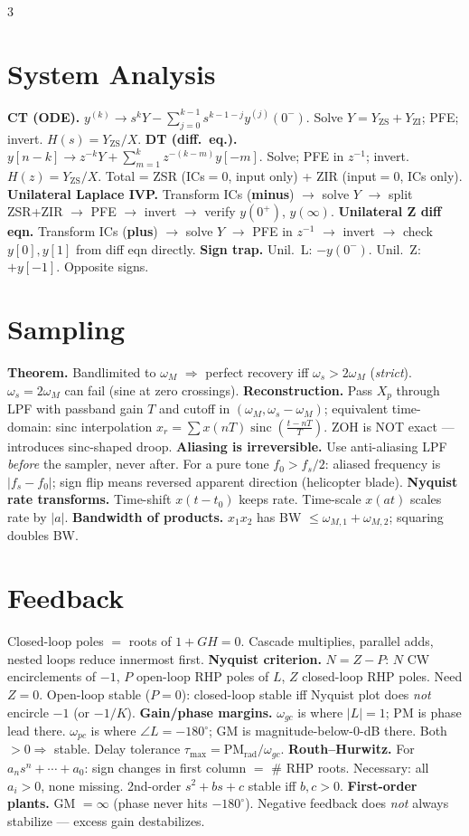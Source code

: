 \documentclass[11pt]{extarticle}
\DeclareMathOperator{\sinc}{sinc}
\begin{document}
\begin{paracol}{3}
\section*{System Analysis}
\textbf{CT (ODE).} $y^{(k)}\!\to\! s^k Y - \sum_{j=0}^{k-1}\! s^{k-1-j} y^{(j)}(0^-)$. Solve $Y=Y_{\text{ZS}}+Y_{\text{ZI}}$; PFE; invert. $H(s)=Y_{\text{ZS}}/X$.
\textbf{DT (diff.\ eq.).} $y[n{-}k]\to z^{-k}Y + \sum_{m=1}^k z^{-(k-m)}y[-m]$. Solve; PFE in $z^{-1}$; invert. $H(z)=Y_{\text{ZS}}/X$.
Total = ZSR (ICs$=0$, input only) + ZIR (input$=0$, ICs only).
\textbf{Unilateral Laplace IVP.} Transform ICs (\textbf{minus}) $\to$ solve $Y$ $\to$ split ZSR+ZIR $\to$ PFE $\to$ invert $\to$ verify $y(0^+)$, $y(\infty)$.
\textbf{Unilateral Z diff eqn.} Transform ICs (\textbf{plus}) $\to$ solve $Y$ $\to$ PFE in $z^{-1}$ $\to$ invert $\to$ check $y[0], y[1]$ from diff eqn directly.
\textbf{Sign trap.} Unil.\ L: $\mathbf{-}y(0^-)$. Unil.\ Z: $\mathbf{+}y[-1]$. Opposite signs.

\section*{Sampling}
\textbf{Theorem.} Bandlimited to $\omega_M$ $\Rightarrow$ perfect recovery iff $\omega_s>2\omega_M$ (\emph{strict}). $\omega_s=2\omega_M$ can fail (sine at zero crossings).
\textbf{Reconstruction.} Pass $X_p$ through LPF with passband gain $T$ and cutoff in $(\omega_M,\omega_s{-}\omega_M)$; equivalent time-domain: sinc interpolation $x_r=\sum x(nT)\sinc(\tfrac{t-nT}{T})$. ZOH is NOT exact --- introduces sinc-shaped droop.
\textbf{Aliasing is irreversible.} Use anti-aliasing LPF \emph{before} the sampler, never after. For a pure tone $f_0>f_s/2$: aliased frequency is $|f_s-f_0|$; sign flip means reversed apparent direction (helicopter blade).
\textbf{Nyquist rate transforms.} Time-shift $x(t-t_0)$ keeps rate. Time-scale $x(at)$ scales rate by $|a|$.
\textbf{Bandwidth of products.} $x_1 x_2$ has BW $\le \omega_{M,1}+\omega_{M,2}$; squaring doubles BW.

\section*{Feedback}
Closed-loop poles $=$ roots of $1+GH=0$. Cascade multiplies, parallel adds, nested loops reduce innermost first.
\textbf{Nyquist criterion.} $N=Z-P$: $N$ CW encirclements of $-1$, $P$ open-loop RHP poles of $L$, $Z$ closed-loop RHP poles. Need $Z=0$. Open-loop stable ($P=0$): closed-loop stable iff Nyquist plot does \emph{not} encircle $-1$ (or $-1/K$).
\textbf{Gain/phase margins.} $\omega_{gc}$ is where $|L|=1$; PM is phase lead there. $\omega_{pc}$ is where $\angle L=-180^\circ$; GM is magnitude-below-0-dB there. Both $>0 \Rightarrow$ stable. Delay tolerance $\tau_{\max}=\mathrm{PM}_\mathrm{rad}/\omega_{gc}$.
\textbf{Routh--Hurwitz.} For $a_n s^n+\cdots+a_0$: sign changes in first column $=$ \# RHP roots. Necessary: all $a_i>0$, none missing. 2nd-order $s^2+bs+c$ stable iff $b,c>0$.
\textbf{First-order plants.} GM $=\infty$ (phase never hits $-180^\circ$). Negative feedback does \emph{not} always stabilize --- excess gain destabilizes.


\end{paracol}
\end{document}

